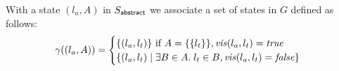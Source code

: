 With a state $(l_a,A)$ in $S_{\mathsf{abstract}}$ we associate a set of states in $G$ defined as follows:
\[
\gamma((l_a,A)) =
\begin{cases}
\{(l_a,l_t)\} \text{ if } A = \{\{l_t\}\}, \mathit{vis}(l_a,l_t) = \mathit{true}\\
\{(l_a,l_t) \mid \exists B\in A.\; l_t \in B, \mathit{vis}(l_a,l_t) = \mathit{false}\}\\
\end{cases}
\]


